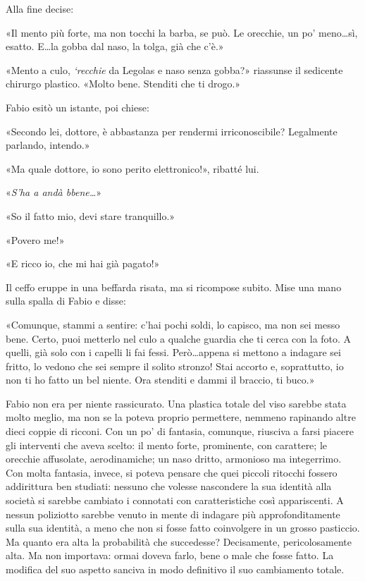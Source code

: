 Alla fine decise:

«Il mento più forte, ma non tocchi la barba, se può. Le orecchie, un po' meno\ldots sì, esatto. E\ldots la gobba dal naso, la tolga, già che c'è.»

«Mento a culo, \textit{`recchie} da Legolas e naso senza gobba?» riassunse il sedicente chirurgo plastico. «Molto bene. Stenditi che ti drogo.»

Fabio esitò un istante, poi chiese:

«Secondo lei, dottore, è abbastanza per rendermi irriconoscibile? Legalmente parlando, intendo.»

«Ma quale dottore, io sono perito elettronico!», ribatté lui.

«\textit{S'ha a andà bbene\ldots}»

«So il fatto mio, devi stare tranquillo.»

«Povero me!»

«E ricco io, che mi hai già pagato!»

Il ceffo eruppe in una beffarda risata, ma si ricompose subito. Mise una mano sulla spalla di Fabio e disse:

«Comunque, stammi a sentire: c'hai pochi soldi, lo capisco, ma non sei messo bene. Certo, puoi metterlo nel culo a qualche guardia che ti cerca con la foto. A quelli, già solo con i capelli li fai fessi. Però\ldots appena si mettono a indagare sei fritto, lo vedono che sei sempre il solito stronzo! Stai accorto e, soprattutto, io non ti ho fatto un bel niente. Ora stenditi e dammi il braccio, ti buco.»

Fabio non era per niente rassicurato. Una plastica totale del viso sarebbe stata molto meglio, ma non se la poteva proprio permettere, nemmeno rapinando altre dieci coppie di ricconi. Con un po' di fantasia, comunque, riusciva a farsi piacere gli interventi che aveva scelto: il mento forte, prominente, con carattere; le orecchie affusolate, aerodinamiche; un naso dritto, armonioso ma integerrimo. Con molta fantasia, invece, si poteva pensare che quei piccoli ritocchi fossero addirittura ben studiati: nessuno che volesse nascondere la sua identità alla società si sarebbe cambiato i connotati con caratteristiche così appariscenti. A nessun poliziotto sarebbe venuto in mente di indagare più approfonditamente sulla sua identità, a meno che non si fosse fatto coinvolgere in un grosso pasticcio. Ma quanto era alta la probabilità che succedesse? Decisamente, pericolosamente alta. Ma non importava: ormai doveva farlo, bene o male che fosse fatto. La modifica del suo aspetto sanciva in modo definitivo il suo cambiamento totale.

